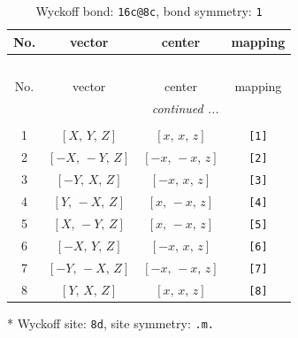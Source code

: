 \documentclass[fleqn,8pt]{jsarticle}
\begin{document}
\renewcommand{\arraystretch}{1.2}
\begin{longtable}{cccc}
\caption{Wyckoff bond: {\tt 16c@8c}, bond symmetry: {\tt 1}}
 \\
 \hline \hline
No. & vector & center & mapping \\ \hline \endfirsthead

\multicolumn{3}{l}{\tablename\ \thetable{}} \\
 \hline \hline
No. & vector & center & mapping \\ \hline \endhead

 \hline \hline
\multicolumn{3}{r}{\footnotesize\it continued ...} \\ \endfoot

 \hline \hline
\multicolumn{3}{r}{} \\ \endlastfoot

1 & $\left[ X,\, Y,\, Z \right]$ & $\left[ x,\, x,\, z \right]$ & {\tt [1]} \\ \hline
2 & $\left[ - X,\, - Y,\, Z \right]$ & $\left[ - x,\, - x,\, z \right]$ & {\tt [2]} \\ \hline
3 & $\left[ - Y,\, X,\, Z \right]$ & $\left[ - x,\, x,\, z \right]$ & {\tt [3]} \\ \hline
4 & $\left[ Y,\, - X,\, Z \right]$ & $\left[ x,\, - x,\, z \right]$ & {\tt [4]} \\ \hline
5 & $\left[ X,\, - Y,\, Z \right]$ & $\left[ x,\, - x,\, z \right]$ & {\tt [5]} \\ \hline
6 & $\left[ - X,\, Y,\, Z \right]$ & $\left[ - x,\, x,\, z \right]$ & {\tt [6]} \\ \hline
7 & $\left[ - Y,\, - X,\, Z \right]$ & $\left[ - x,\, - x,\, z \right]$ & {\tt [7]} \\ \hline
8 & $\left[ Y,\, X,\, Z \right]$ & $\left[ x,\, x,\, z \right]$ & {\tt [8]} \\
\end{longtable}
* Wyckoff site: {\tt 8d}, site symmetry: {\tt .m.}
\renewcommand{\arraystretch}{1.2}
\end{document}
